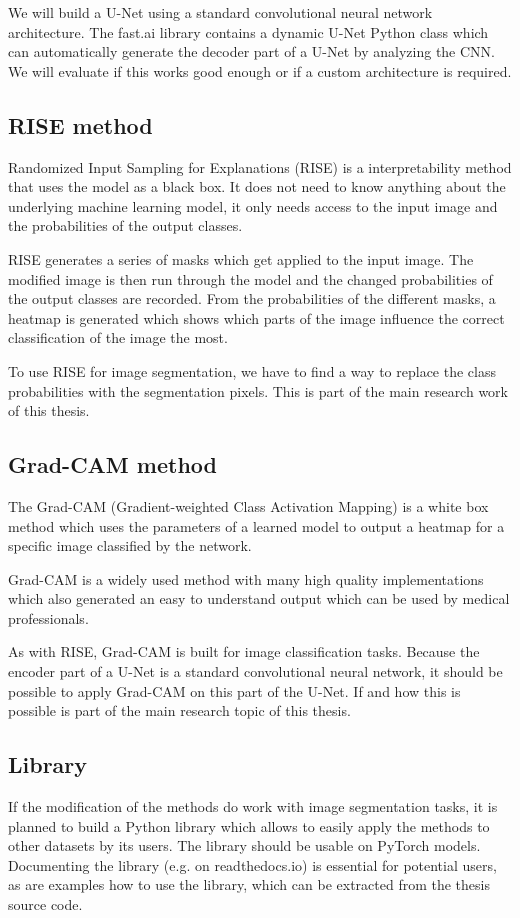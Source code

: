 We will build a U-Net using a standard convolutional neural network architecture. The fast.ai library contains a dynamic U-Net Python class which can automatically generate the decoder part of a U-Net by analyzing the CNN. We will evaluate if this works good enough or if a custom architecture is required.

\subsection{RISE method}
Randomized Input Sampling for Explanations (RISE) is a interpretability method that uses the model as a black box. It does not need to know anything about the underlying machine learning model, it only needs access to the input image and the probabilities of the output classes.

RISE generates a series of masks which get applied to the input image. The modified image is then run through the model and the changed probabilities of the output classes are recorded. From the probabilities of the different masks, a heatmap is generated which shows which parts of the image influence the correct classification of the image the most.

To use RISE for image segmentation, we have to find a way to replace the class probabilities with the segmentation pixels. This is part of the main research work of this thesis.


\subsection{Grad-CAM method}
The Grad-CAM \cite{selvaraju2017grad} (Gradient-weighted Class Activation Mapping) is a white box method which uses the parameters of a learned model to output a heatmap for a specific image classified by the network.

Grad-CAM is a widely used method with many high quality implementations which also generated an easy to understand output which can be used by medical professionals.

As with RISE, Grad-CAM is built for image classification tasks. Because the encoder part of a U-Net is a standard convolutional neural network, it should be possible to apply Grad-CAM on this part of the U-Net. If and how this is possible is part of the main research topic of this thesis.


\subsection{Library}
If the modification of the methods do work with image segmentation tasks, it is planned to build a Python library which allows to easily apply the methods to other datasets by its users. The library should be usable on PyTorch models. Documenting the library (e.g. on readthedocs.io) is essential for potential users, as are examples how to use the library, which can be extracted from the thesis source code.

